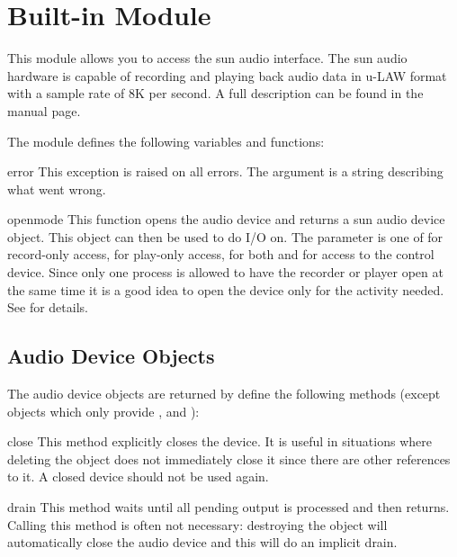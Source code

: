 \section{Built-in Module }



This module allows you to access the sun audio interface. The sun
audio hardware is capable of recording and playing back audio data
in u-LAW format with a sample rate of 8K per second. A
full description can be found in the  manual page.

The module defines the following variables and functions:

\begin{excdesc}{error}
This exception is raised on all errors. The argument is a string
describing what went wrong.
\end{excdesc}

\begin{funcdesc}{open}{mode}
This function opens the audio device and returns a sun audio device
object. This object can then be used to do I/O on. The  parameter
is one of  for record-only access,  for play-only
access,  for both and  for access to the
control device. Since only one process is allowed to have the recorder
or player open at the same time it is a good idea to open the device
only for the activity needed. See  for details.
\end{funcdesc}


\subsection{Audio Device Objects}
\label{audio-device-objects}

The audio device objects are returned by  define the
following methods (except  objects which only provide
,  and ):

\begin{methoddesc}{close}{}
This method explicitly closes the device. It is useful in situations
where deleting the object does not immediately close it since there
are other references to it. A closed device should not be used again.
\end{methoddesc}

\begin{methoddesc}{drain}{}
This method waits until all pending output is processed and then returns.
Calling this method is often not necessary: destroying the object will
automatically close the audio device and this will do an implicit drain.
\end{methoddesc}

